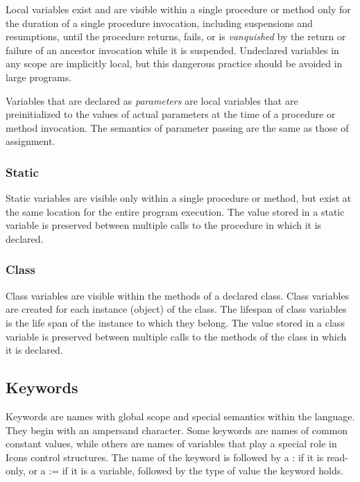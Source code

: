 Local variables exist and are visible within a single procedure or method
only for the duration of a single
procedure invocation, including suspensions and resumptions, until the
procedure returns, fails, or is \textit{vanquished} by the return or
failure of an ancestor invocation while it is suspended.
Undeclared variables in any scope are implicitly local, but this
dangerous practice should be avoided in large programs.

Variables that are declared as \textit{parameters} are local variables
that are preinitialized to the values of actual parameters at the time
of a procedure or method invocation. The semantics of parameter passing
are the same as those of assignment.

\subsubsection{Static}

Static variables are visible only within a single procedure or method,
but exist at the same location for the entire program execution. The
value stored in a static variable is preserved between multiple calls
to the procedure in which it is declared.

\subsubsection{Class}

Class variables are visible within the methods of a declared class.
Class variables are created for each
instance (object) of the class. The lifespan of
class variables is the life span of the instance to which
they belong. The value stored in a class variable is preserved between
multiple calls to the methods of the class in which it is declared.

\subsection[Keywords]{Keywords}

Keywords are names with global scope and special semantics
within the language. They begin with an ampersand character. Some
keywords are names of common constant values, while others are names of
variables that play a special role in Icon{\textquotesingle}s
control structures. The name of the keyword is
followed by a : if it is read-only, or a := if it is a variable,
followed by the type of value the keyword holds.

